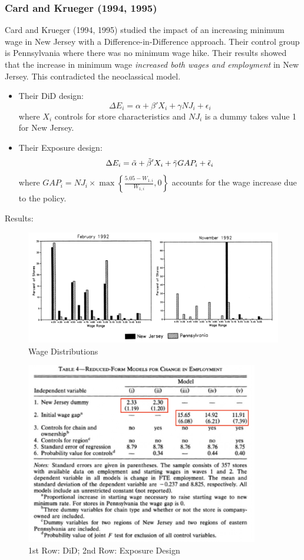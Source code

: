         \subsubsection{Card and Krueger (1994, 1995)}
            Card and Krueger (1994, 1995) studied the impact of an increasing minimum wage in New Jersey with a Difference-in-Difference approach. Their control group is Pennsylvania where there was no minimum wage hike. Their results showed that the increase in minimum wage \emph{increased both wages and employment} in New Jersey. This contradicted the neoclassical model.
            \begin{itemize}
                \item Their DiD design:
                $$\Delta E_i = \alpha + \beta 'X_i + \gamma NJ_i + \epsilon_i$$
                where $X_i$ controls for store characteristics and $NJ_i$ is a dummy takes value 1 for New Jersey.
                \item Their Exposure design:
                $$\Delta E_i = \Tilde{\alpha} +\Tilde{\beta} 'X_i +\Tilde{\gamma} GAP_i + \Tilde{\epsilon}_i$$
                where $GAP_i = NJ_i \times \max \left\{\frac{5.05 - W_{1,i}}{W_{1,i}},0\right\}$ accounts for the wage increase due to the policy.
            \end{itemize}
            Results:
            \begin{figure}[H]
                \centering
                \includegraphics[width=5in]{images/ch2/New Jersey.png}
                \caption{Wage Distributions}
            \end{figure}
            \begin{figure}[H]
                \centering
                \includegraphics[width=4in]{images/ch2/New_Jersey 2.png}
                \caption{1st Row: DiD; 2nd Row: Exposure Design}
            \end{figure}
